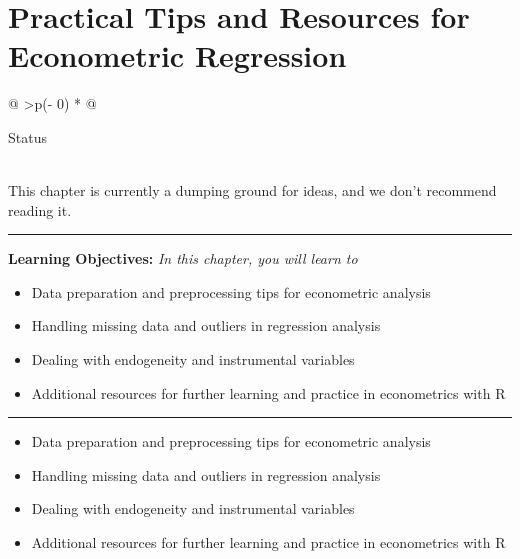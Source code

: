 \documentclass[
  letterpaper,
  paper =a4,
  twoside,
  openright,
  headsepline,
  footsepline,
  listof = totocnumbered,
  chapterprefix = true,
  firstiscover]{scrbook}
\providecommand{\abstractname}{Learning Objectives} %
\newenvironment{objectives}[1]{%
	\hrule
	\vspace{5pt}
	\small\textbf{\abstractname: } 
	\newline
	\vspace{0.1cm}
	\small\emph{#1} %
	\itshape %
}{%
	\vspace{5pt}
	\hrule
	\vspace{0.6cm}
}
\begin{document}
\hypertarget{practical-tips-and-resources-for-econometric-regression}{%
\chapter{Practical Tips and Resources for Econometric
Regression}\label{practical-tips-and-resources-for-econometric-regression}}

\begin{longtable}[]{@{}
  >{\centering\arraybackslash}p{(\columnwidth - 0\tabcolsep) * }@{}}
\toprule\noalign{}
\begin{minipage}[b]{\linewidth}\centering
Status
\end{minipage} \\
\midrule\noalign{}
\endhead
\bottomrule\noalign{}
\endlastfoot
This chapter is currently a dumping ground for ideas, and we don't
recommend reading it. \\
\end{longtable}

\begin{objectives}{In this chapter, you will learn to}
\begin{itemize}

\item{Data preparation and preprocessing tips for econometric analysis}

\item{Handling missing data and outliers in regression analysis}

\item{Dealing with endogeneity and instrumental variables}

\item{Additional resources for further learning and practice in econometrics with R}

\end{itemize}

\end{objectives}

\begin{itemize}
\item
  Data preparation and preprocessing tips for econometric analysis
\item
  Handling missing data and outliers in regression analysis
\item
  Dealing with endogeneity and instrumental variables
\item
  Additional resources for further learning and practice in econometrics
  with R
\end{itemize}
\end{document}
